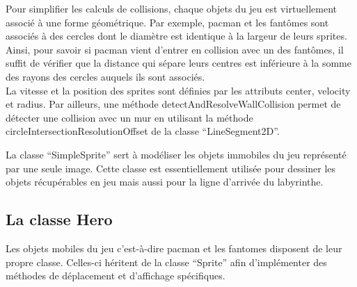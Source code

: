 \documentclass{article}
\begin{document}
Pour simplifier les calculs de collisions, chaque objets du jeu est virtuellement associé à une forme géométrique.
Par exemple, pacman et les fantômes sont associés à des cercles dont le diamètre est identique à la largeur de leurs sprites.
Ainsi, pour savoir si pacman vient d'entrer en collision avec un des fantômes, il suffit de vérifier que la distance qui sépare leurs centres est inférieure à la somme des rayons des cercles auquels ils sont associés.\\

La vitesse et la position des sprites sont définies par les attributs center, velocity et radius. 
Par ailleurs, une méthode detectAndResolveWallCollision permet de détecter une collision avec un mur en utilisant la méthode circleIntersectionResolutionOffset de la classe \enquote{LineSegment2D}.

La classe \enquote{SimpleSprite} sert à modéliser les objets immobiles du jeu représenté par une seule image.
Cette classe est essentiellement utilisée pour dessiner les objets récupérables en jeu mais aussi pour la ligne d'arrivée du labyrinthe.\\

\subsection{La classe Hero}
Les objets mobiles du jeu c'est-à-dire pacman et les fantomes disposent de leur propre classe.
Celles-ci héritent de la classe \enquote{Sprite} afin d'implémenter des méthodes de déplacement et d'affichage spécifiques.\\
\end{document}
